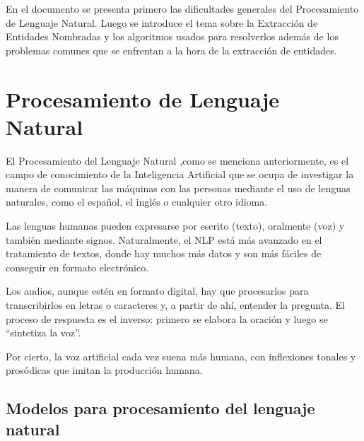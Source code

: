 \documentclass[runningheads]{llncs}
\begin{document}
En el documento se presenta primero las dificultades generales del Procesamiento de Lenguaje Natural. Luego se introduce el tema sobre la Extracción de Entidades Nombradas y los algoritmos usados para resolverlos además de los problemas comunes que se enfrentan a la hora de la extracción de entidades.

\section{Procesamiento de Lenguaje Natural}

El Procesamiento del Lenguaje Natural ,como se menciona anteriormente, es el campo de conocimiento de la Inteligencia Artificial que se ocupa de investigar la manera de comunicar las máquinas con las personas mediante el uso de lenguas naturales, como el español, el inglés o cualquier otro idioma.

Las lenguas humanas pueden expresarse por escrito (texto), oralmente (voz) y también mediante signos. Naturalmente, el NLP está más avanzado en el tratamiento de textos, donde hay muchos más datos y son más fáciles de conseguir en formato electrónico.

Los audios, aunque estén en formato digital, hay que procesarlos para transcribirlos en letras o caracteres y, a partir de ahí, entender la pregunta. El proceso de respuesta es el inverso: primero se elabora la oración y luego se “sintetiza la voz”.

Por cierto, la voz artificial cada vez suena más humana, con inflexiones tonales y prosódicas que imitan la producción humana.


\subsection{Modelos para procesamiento del lenguaje natural}
\end{document}
